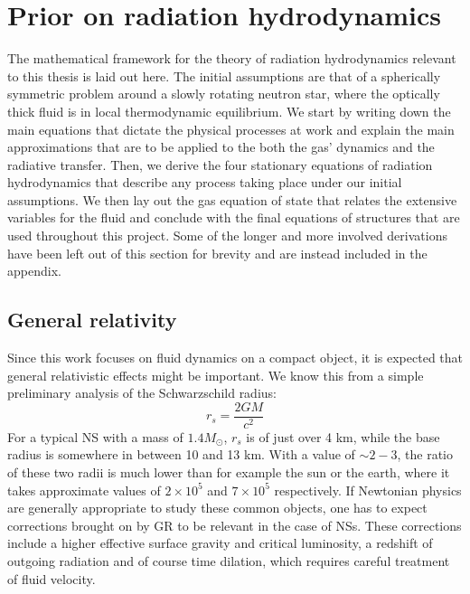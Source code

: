 \documentclass[../main.tex]{subfiles}
\begin{document}
\section{Prior on radiation hydrodynamics}

The mathematical framework for the theory of radiation hydrodynamics relevant to this thesis is laid out here. The initial assumptions are that of a spherically symmetric problem around a slowly rotating neutron star, where the optically thick fluid is in local thermodynamic equilibrium. We start by writing down the main equations that dictate the physical processes at work and explain the main approximations that are to be applied to the both the gas' dynamics and the radiative transfer. Then, we derive the four stationary equations of radiation hydrodynamics that describe any process taking place under our initial assumptions. We then lay out the gas equation of state that relates the extensive variables for the fluid and conclude with the final equations of structures that are used throughout this project. Some of the longer and more involved derivations have been left out of this section for brevity and are instead included in the appendix.

\subsection{General relativity}

Since this work focuses on fluid dynamics on a compact object, it is expected that general relativistic effects might be important.  We know this from a simple preliminary analysis of the Schwarzschild radius:
\begin{equation}
    r_s=\frac{2GM}{c^2}
\end{equation}
For a typical NS with a mass of $1.4 M_\odot$, $r_s$ is of just over 4 km, while the base radius is somewhere in between 10 and 13 km.  With a value of $\sim 2-3$, the ratio of these two radii is much lower than for example the sun or the earth, where it takes approximate values of  $2\times 10^5$ and $7\times 10^5$ respectively.  If Newtonian physics are generally appropriate to study these common objects, one has to expect corrections brought on by GR to be relevant in the case of NSs.  These corrections include a higher effective surface gravity and critical luminosity, a redshift of outgoing radiation and of course time dilation, which requires careful treatment of fluid velocity.\\
\end{document}
